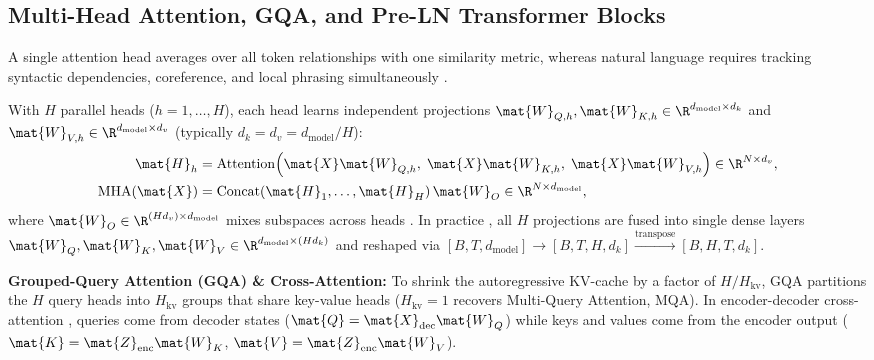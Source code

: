 \documentclass[../../../../master.tex]{subfiles}
\begin{document}

\subsection{Multi-Head Attention, GQA, and Pre-LN Transformer Blocks}

A single attention head averages over all token relationships with one similarity metric, whereas natural language requires tracking syntactic dependencies, coreference, and local phrasing simultaneously .

\begin{coremath}
With $H$ parallel heads ($h = 1, \dots, H$), each head learns independent projections $\mat{W}_{Q,h}, \mat{W}_{K,h} \in \R^{d_{\mathrm{model}} \times d_k}$ and $\mat{W}_{V,h} \in \R^{d_{\mathrm{model}} \times d_v}$ (typically $d_k = d_v = d_{\mathrm{model}}/H$):
\begin{align}
  \mat{H}_h &= \mathrm{Attention}\!\left(\mat{X}\mat{W}_{Q,h},\; \mat{X}\mat{W}_{K,h},\; \mat{X}\mat{W}_{V,h}\right) \in \R^{N \times d_v}, \label{eq:attn:mha_head} \\
  \mathrm{MHA}(\mat{X}) &= \mathrm{Concat}(\mat{H}_1, \dots, \mat{H}_H)\,\mat{W}_O \in \R^{N \times d_{\mathrm{model}}}, \label{eq:attn:mha_concat}
\end{align}
where $\mat{W}_O \in \R^{(H d_v) \times d_{\mathrm{model}}}$ mixes subspaces across heads  . In practice , all $H$ projections are fused into single dense layers $\mat{W}_Q, \mat{W}_K, \mat{W}_V \in \R^{d_{\mathrm{model}} \times (H d_k)}$ and reshaped via $[B, T, d_{\mathrm{model}}] \to [B, T, H, d_k] \xrightarrow{\mathrm{transpose}} [B, H, T, d_k]$.

\textbf{Grouped-Query Attention (GQA) \& Cross-Attention:} To shrink the autoregressive KV-cache by a factor of $H / H_{\mathrm{kv}}$, GQA partitions the $H$ query heads into $H_{\mathrm{kv}}$ groups that share key-value heads ($H_{\mathrm{kv}}=1$ recovers Multi-Query Attention, MQA). In encoder-decoder cross-attention , queries come from decoder states ($\mat{Q} = \mat{X}_{\mathrm{dec}}\mat{W}_Q$) while keys and values come from the encoder output ($\mat{K} = \mat{Z}_{\mathrm{enc}}\mat{W}_K$, $\mat{V} = \mat{Z}_{\mathrm{enc}}\mat{W}_V$).
\end{coremath}
\end{document}
